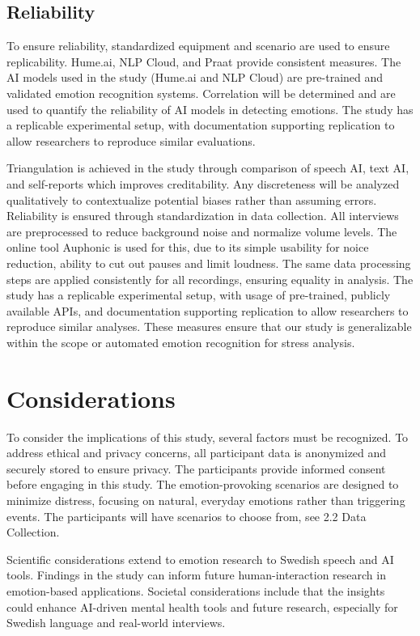 \subsection{Reliability}
To ensure reliability, standardized equipment and scenario are used to ensure replicability. Hume.ai, NLP Cloud, and Praat provide consistent measures. The AI models used in the study (Hume.ai and NLP Cloud) are pre-trained and validated emotion recognition systems. Correlation will be determined and are used to quantify the reliability of AI models in detecting emotions. The study has a replicable experimental setup, with documentation supporting replication to allow researchers to reproduce similar evaluations.  

Triangulation is achieved in the study through comparison of speech AI, text AI, and self-reports which improves creditability. Any discreteness will be analyzed qualitatively to contextualize potential biases rather than assuming errors. 
Reliability is ensured through standardization in data collection. All interviews are preprocessed to reduce background noise and normalize volume levels. The online tool Auphonic \autocite{Auphonic} is used for this, due to its simple usability for noice reduction, ability to cut out pauses and limit loudness. The same data processing steps are applied consistently for all recordings, ensuring equality in analysis. The study has a replicable experimental setup, with usage of pre-trained, publicly available APIs, and documentation supporting replication to allow researchers to reproduce similar analyses. These measures ensure that our study is generalizable within the scope or automated emotion recognition for stress analysis. 

\section{Considerations}
To consider the implications of this study, several factors must be recognized. To address ethical and privacy concerns, all participant data is anonymized and securely stored to ensure privacy. The participants provide informed consent before engaging in this study. The emotion-provoking scenarios are designed to minimize distress, focusing on natural, everyday emotions rather than triggering events. The participants will have scenarios to choose from, see 2.2 Data Collection. 

Scientific considerations extend to emotion research to Swedish speech and AI tools. Findings in the study can inform future human-interaction research in emotion-based applications. Societal considerations include that the insights could enhance AI-driven mental health tools and future research, especially for Swedish language and real-world interviews. 
